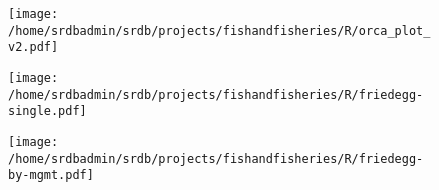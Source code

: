 \begin{figure}
\begin{center}
\texttt{[image: /home/srdbadmin/srdb/projects/fishandfisheries/R/orca\_plot\_v2.pdf]}
\end{center}
\caption{ }\label{fig:orca}
\end{figure}

\begin{figure}
\begin{center}
\texttt{[image: /home/srdbadmin/srdb/projects/fishandfisheries/R/friedegg-single.pdf]}
\end{center}
\caption{ }\label{fig:friedegg}
\end{figure}

\begin{figure}
\begin{center}
\texttt{[image: /home/srdbadmin/srdb/projects/fishandfisheries/R/friedegg-by-mgmt.pdf]}
\end{center}
\caption{ }\label{fig:friedeggmgmt}
\end{figure}

